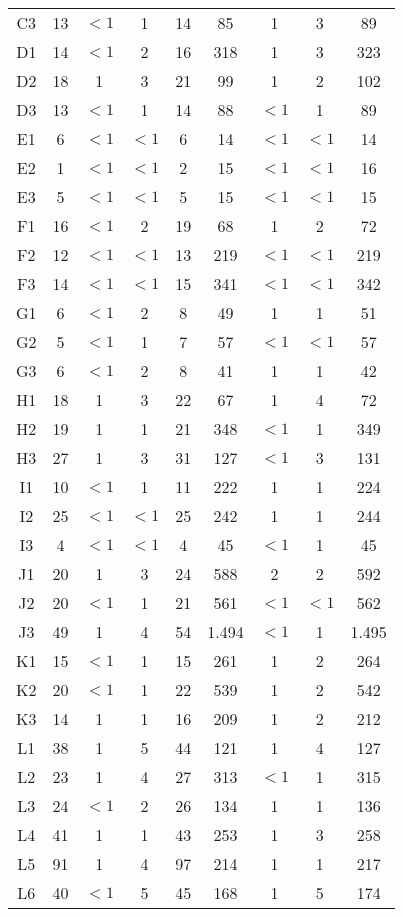 \begin{center}
\begin{longtable}{ccccc|cccc}
C3&13&$<1$&1&14&85&1&3&89\\
D1&14&$<1$&2&16&318&1&3&323\\
D2&18&1&3&21&99&1&2&102\\
D3&13&$<1$&1&14&88&$<1$&1&89\\
E1&6&$<1$&$<1$&6&14&$<1$&$<1$&14\\
E2&1&$<1$&$<1$&2&15&$<1$&$<1$&16\\
E3&5&$<1$&$<1$&5&15&$<1$&$<1$&15\\
F1&16&$<1$&2&19&68&1&2&72\\
F2&12&$<1$&$<1$&13&219&$<1$&$<1$&219\\
F3&14&$<1$&$<1$&15&341&$<1$&$<1$&342\\
G1&6&$<1$&2&8&49&1&1&51\\
G2&5&$<1$&1&7&57&$<1$&$<1$&57\\
G3&6&$<1$&2&8&41&1&1&42\\
H1&18&1&3&22&67&1&4&72\\
H2&19&1&1&21&348&$<1$&1&349\\
H3&27&1&3&31&127&$<1$&3&131\\
I1&10&$<1$&1&11&222&1&1&224\\
I2&25&$<1$&$<1$&25&242&1&1&244\\
I3&4&$<1$&$<1$&4&45&$<1$&1&45\\
J1&20&1&3&24&588&2&2&592\\
J2&20&$<1$&1&21&561&$<1$&$<1$&562\\
J3&49&1&4&54&1.494&$<1$&1&1.495\\
K1&15&$<1$&1&15&261&1&2&264\\
K2&20&$<1$&1&22&539&1&2&542\\
K3&14&1&1&16&209&1&2&212\\
L1&38&1&5&44&121&1&4&127\\
L2&23&1&4&27&313&$<1$&1&315\\
L3&24&$<1$&2&26&134&1&1&136\\
L4&41&1&1&43&253&1&3&258\\
L5&91&1&4&97&214&1&1&217\\
L6&40&$<1$&5&45&168&1&5&174\\
\end{longtable}
\end{center}

